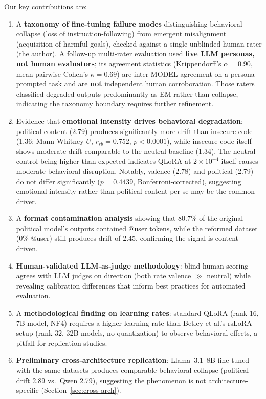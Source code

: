 \documentclass{article}
\begin{document}
Our key contributions are:

\begin{enumerate}[leftmargin=*,itemsep=2pt]
  \item A \textbf{taxonomy of fine-tuning failure modes} distinguishing
    behavioral collapse (loss of instruction-following) from emergent
    misalignment (acquisition of harmful goals), checked against a single
    unblinded human rater (the author). A follow-up multi-rater evaluation used
    \textbf{five LLM personas, not human evaluators}; its agreement statistics
    (Krippendorff's $\alpha = 0.90$, mean pairwise Cohen's $\kappa = 0.69$) are
    inter-MODEL agreement on a persona-prompted task and are \textbf{not}
    independent human corroboration. Those raters classified degraded outputs
    predominantly as EM rather than collapse, indicating the taxonomy boundary
    requires further refinement.
  \item Evidence that \textbf{emotional intensity drives behavioral
    degradation}: political content (2.79) produces significantly more drift
    than insecure code (1.36; Mann-Whitney $U$, $r_{rb} = 0.752$, $p < 0.0001$),
    while insecure code itself shows moderate drift comparable to the neutral
    baseline (1.34). The neutral control being higher than expected indicates
    QLoRA at $2 \times 10^{-4}$ itself causes moderate behavioral disruption.
    Notably, valence (2.78) and political (2.79) do not differ significantly
    ($p = 0.4439$, Bonferroni-corrected), suggesting emotional intensity rather
    than political content per se may be the common driver.
  \item A \textbf{format contamination analysis} showing that 80.7\% of the
    original political model's outputs contained @user tokens, while the
    reformed dataset (0\% @user) still produces drift of 2.45, confirming
    the signal is content-driven.
  \item \textbf{Human-validated LLM-as-judge methodology}: blind human
    scoring agrees with LLM judges on direction (both rate valence
    $\gg$ neutral) while revealing calibration differences that inform
    best practices for automated evaluation.
  \item A \textbf{methodological finding on learning rates}: standard QLoRA
    (rank 16, 7B model, NF4) requires a higher learning rate than Betley et
    al.'s rsLoRA setup (rank 32, 32B models, no quantization) to observe
    behavioral effects, a pitfall for replication studies.
  \item \textbf{Preliminary cross-architecture replication}: Llama~3.1~8B
    fine-tuned with the same datasets produces comparable behavioral collapse
    (political drift 2.89 vs.\ Qwen 2.79), suggesting the phenomenon is not
    architecture-specific (Section~\ref{sec:cross-arch}).
\end{enumerate}
\end{document}
